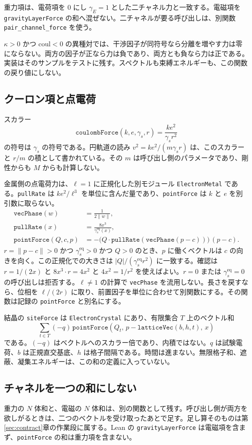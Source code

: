 重力項は、電荷項を \(0\) にし \(\gamma_E=1\) とした二チャネル力と一致する。電磁項を \texttt{gravityLayerForce} の和へ混ぜない。二チャネルが要る呼び出しは、別関数 \texttt{pair\_channel\_force} を使う。

\(\kappa>0\) かつ \(\mathrm{coul}<0\) の異種対では、干渉因子が同符号なら分離を増やす力は零にならない。両方の因子が正なら力は負であり、両方とも負なら力は正である。実装はそのサンプルをテストに残す。スペクトルも束縛エネルギーも、この関数の戻り値にしない。

\subsection{クーロン項と点電荷}

スカラー
\[
\texttt{coulombForce}(k,e,\gamma_s,r)=\frac{k e^2}{\gamma_s r^2}
\]
の符号は \(\gamma_s\) の符号である。円軌道の読み \(v^2=ke^2/(m\gamma_s r)\) は、このスカラーと \(r/m\) の積として書かれている。その \(m\) は呼び出し側のパラメータであり、剛性からも \(M\) からも計算しない。

金属側の点電荷力は、\(\ell=1\) に正規化した別モジュール \texttt{ElectronMetal} である。\texttt{pullRate} は \(ke^2/\ell^3\) を単位に含んだ量であり、\texttt{pointForce} は \(k\) と \(e\) を別引数に取らない。
\begin{align}
\texttt{vecPhase}(w)&=\frac{1}{2\lVert w\rVert},\\
\texttt{pullRate}(x)&=\frac{8x^3}{\gamma_s^{\mathrm{eq}}(x)},\\
\texttt{pointForce}(Q,c,p)
&=-\bigl(Q\cdot\texttt{pullRate}(\texttt{vecPhase}(p-c))\bigr)\,(p-c).
\end{align}
\(r=\lVert p-c\rVert>0\) かつ \(\gamma_s^{\mathrm{eq}}>0\) かつ \(Q>0\) のとき、\(p\) に働くベクトルは \(c\) の向きを向く。この正規化での大きさは \(|Q|/( \gamma_s^{\mathrm{eq}} r^2)\) に一致する。確認は \(r=1/(2x)\) と \(8x^3\cdot r=4x^2\) と \(4x^2=1/r^2\) を使えばよい。\(r=0\) または \(\gamma_s^{\mathrm{eq}}=0\) の呼び出しは拒否する。\(\ell\neq 1\) の計算で \texttt{vecPhase} を流用しない。長さを戻すなら、位相を \(\ell/(2r)\) に取り、前置因子を単位に合わせて別関数にする。その関数は記録の \texttt{pointForce} と別名にする。

結晶の \texttt{siteForce} は \texttt{ElectronCrystal} にあり、有限集合 \(T\) 上のベクトル和
\[
\sum_{t\in T}(-q)\,\texttt{pointForce}(Q_t,\,p-\texttt{latticeVec}(b,h,t),\,x)
\]
である。\((-q)\) はベクトルへのスカラー倍であり、内積ではない。\(q\) は試験電荷、\(b\) は正規直交基底、\(h\) は格子間隔である。時間は進まない。無限格子和、遮蔽、凝集エネルギーは、この和の定義に入っていない。

\subsection{チャネルを一つの和にしない}

重力の \(N\) 体和と、電磁の \(N\) 体和は、別の関数として残す。呼び出し側が両方を欲しがるときは、二つのベクトルを受け取ったあとで足す。足し算そのものは第\ref{sec:contract}章の作業段に属する。Lean の \texttt{gravityLayerForce} は電磁項を含まず、\texttt{pointForce} の和は重力項を含まない。
